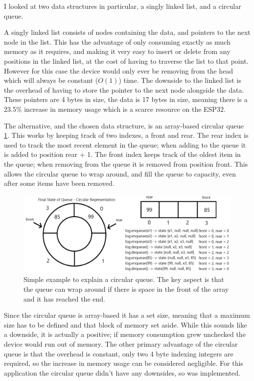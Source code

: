 \documentclass{l4proj}
\begin{document}
I looked at two data structures in particular, a singly linked list, and a circular queue.

A singly linked list consists of nodes containing the data, and pointers to the next node in the list. This has the advantage of only consuming exactly as much memory as it requires, and making it very easy to insert or delete from any positions in the linked list, at the cost of having to traverse the list to that point. However for this case the device would only ever be removing from the head which will always be constant ($O(1)$) time. The downside to the linked list is the overhead of having to store the pointer to the next node alongside the data. These pointers are 4 bytes in size, the data is 17 bytes in size, meaning there is a 23.5\% increase in memory usage which is a scarce resource on the ESP32.

The alternative, and the chosen data structure, is an array-based circular queue \ref{fig:circular_queue}. This works by keeping track of two indexes, a front and rear. The rear index is used to track the most recent element in the queue; when adding to the queue it is added to position rear + 1. The front index keeps track of the oldest item in the queue; when removing from the queue it is removed from position front. This allows the circular queue to wrap around, and fill the queue to capacity, even after some items have been removed.

\begin{figure}[!htb]
    \centering
    \includegraphics[width=1.0\linewidth]{images/circular_queue.png}

    \caption{ Simple example to explain a circular queue. The key aspect is that the queue can wrap around if there is space in the front of the array and it has reached the end. }

    \label{fig:circular_queue}
\end{figure}

Since the circular queue is array-based it has a set size, meaning that a maximum size has to be defined and that block of memory set aside. While this sounds like a downside, it is actually a positive; if memory consumption grew unchecked the device would run out of memory. The other primary advantage of the circular queue is that the overhead is constant, only two 4 byte indexing integers are required, so the increase in memory usage can be considered negligible. For this application the circular queue didn't have any downsides, so was implemented.
\end{document}
